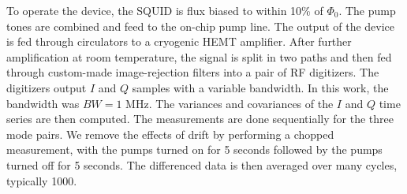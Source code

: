 \documentclass[prl,10pt,twocolumn,superscriptaddress,notitlepage,floatfix,amssymb]{revtex4}
\begin{document}
To operate the device, the SQUID is flux biased to within 10\% of $\Phi_0$.  The pump tones are combined and feed to the on-chip pump line. The output of the device is fed through circulators to a cryogenic HEMT amplifier. After further amplification at room temperature, the signal is split in two paths and then fed through custom-made image-rejection filters into a pair of RF digitizers.  The digitizers output $I$ and $Q$ samples with a variable bandwidth.  In this work, the bandwidth was $BW = 1$ MHz. The variances and covariances of the $I$ and $Q$ time series are then computed. The measurements are done sequentially for the three mode pairs.  We remove the effects of drift by performing a chopped measurement, with the pumps turned on for 5 seconds followed by the pumps turned off for 5 seconds. The differenced data is then averaged over many cycles, typically 1000.

\end{document}
